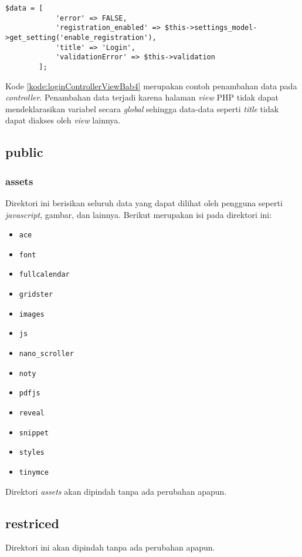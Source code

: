 \begin{lstlisting}[caption=Penambahan kode pada \textit{Login.php}, label=kode:loginControllerViewBab4]
	$data = [
			'error' => FALSE,
			'registration_enabled' => $this->settings_model->get_setting('enable_registration'),
			'title' => 'Login',
			'validationError' => $this->validation
		];
\end{lstlisting}

Kode \ref{kode:loginControllerViewBab4} merupakan contoh penambahan data pada \textit{controller}. Penambahan data terjadi karena halaman \textit{view} PHP tidak dapat mendeklarasikan variabel secara \textit{global} sehingga data-data seperti \textit{title} tidak dapat diakses oleh \textit{view} lainnya.

\subsection{public}
	\subsubsection{assets}
	Direktori ini berisikan seluruh data yang dapat dilihat oleh pengguna seperti \textit{javascript}, gambar, dan lainnya. Berikut merupakan isi pada direktori ini:
	\begin{itemize}
		\item \texttt{ace}
		\item \texttt{font}
		\item \texttt{fullcalendar}
		\item \texttt{gridster}
		\item \texttt{images}
		\item \texttt{js}
		\item \texttt{nano\_scroller}
		\item \texttt{noty}
		\item \texttt{pdfjs}
		\item \texttt{reveal}
		\item \texttt{snippet}
		\item \texttt{styles}
		\item \texttt{tinymce}
	\end{itemize}
Direktori \textit{assets} akan dipindah tanpa ada perubahan apapun.

\subsection{restriced}
Direktori ini akan dipindah tanpa ada perubahan apapun.